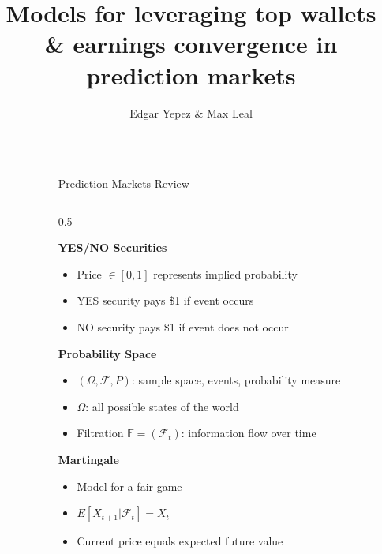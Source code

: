 \documentclass[final]{beamer}
\title{Models for leveraging top wallets \& earnings convergence in prediction markets}
\author{Edgar Yepez \& Max Leal}
\institute[shortinst]{Department of Mathematics, Texas A\&M University}
\newlength{\sepwidth}
\newlength{\colwidth}
\newcommand{\separatorcolumn}{\begin{column}{\sepwidth}\end{column}}
\begin{document}

\begin{frame}[t]
\begin{columns}[t]
\separatorcolumn

\begin{column}{\colwidth}

  \begin{block}{Prediction Markets Review}

    \begin{columns}[t]
    \begin{column}{0.5\linewidth}

      \textbf{YES/NO Securities}
      \begin{itemize}
        \item Price $\in [0,1]$ represents implied probability
        \item YES security pays \$1 if event occurs
        \item NO security pays \$1 if event does not occur
      \end{itemize}

      \textbf{Probability Space}
      \begin{itemize}
        \item $(\Omega, \mathcal{F}, P)$: sample space, events, probability measure
        \item $\Omega$: all possible states of the world
        \item Filtration $\mathbb{F} = (\mathcal{F}_t)$: information flow over time
      \end{itemize}

      \textbf{Martingale}
      \begin{itemize}
        \item Model for a fair game
        \item $E[X_{t+1} | \mathcal{F}_t] = X_t$
        \item Current price equals expected future value
      \end{itemize}


\end{column}
\end{columns}
\end{block}
\end{column}
\end{columns}
\end{frame}
\end{document}
